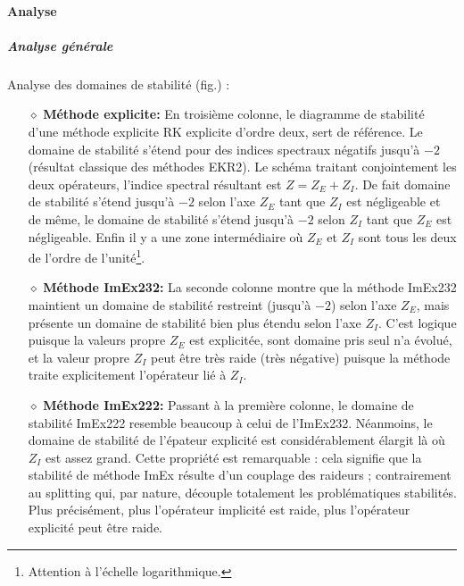         \paragraph{Analyse}
            \subparagraph{Analyse générale}\label{par:analyse_generale_stab_nagumo}
                Analyse des domaines de stabilité (fig.) :
                \begin{itemize}
                    \item[$\diamond$]\textbf{Méthode explicite:} En troisième colonne, le diagramme de stabilité d'une méthode explicite RK explicite d'ordre deux, sert de référence. 
                        Le domaine de stabilité s'étend pour des indices spectraux négatifs jusqu'à $-2$ (résultat classique des méthodes EKR2).
                        Le schéma traitant conjointement les deux opérateurs, l'indice spectral résultant est $Z=Z_E+Z_I$. 
                        De fait domaine de stabilité s'étend jusqu'à $-2$ selon l'axe $Z_E$ tant que $Z_I$ est négligeable et de même,
                        le domaine de stabilité s'étend jusqu'à $-2$ selon $Z_I$ tant que $Z_E$ est négligeable. 
                        Enfin il y a une zone intermédiaire où $Z_E$ et $Z_I$ sont tous les deux de l'ordre de l'unité\footnote{Attention à l'échelle logarithmique.}.

                    \item[$\diamond$]\textbf{Méthode ImEx232:} La seconde colonne montre que la méthode ImEx232 maintient un domaine de stabilité restreint (jusqu'à $-2$) selon l'axe $Z_E$,
                        mais présente un domaine de stabilité bien plus étendu selon l'axe $Z_I$.
                        C'est logique puisque la valeurs propre $Z_E$ est explicitée,
                        sont domaine pris seul n'a évolué, et la valeur propre $Z_I$ peut être très raide (très négative) puisque la méthode traite explicitement l'opérateur lié à $Z_I$.

                    \item[$\diamond$]\textbf{Méthode ImEx222:} Passant à la première colonne, le domaine de stabilité ImEx222 resemble beaucoup à celui de l'ImEx232.
                        Néanmoins, le domaine de stabilité de l’épateur explicité est considérablement élargit 
                        là où $Z_I$ est assez grand. Cette propriété est remarquable : cela signifie que la stabilité de méthode ImEx résulte d'un couplage des raideurs ;
                        contrairement au splitting qui, par nature, découple totalement les problématiques stabilités.
                        Plus précisément, plus l'opérateur implicité est raide, plus l'opérateur explicité peut être raide.
                \end{itemize}

